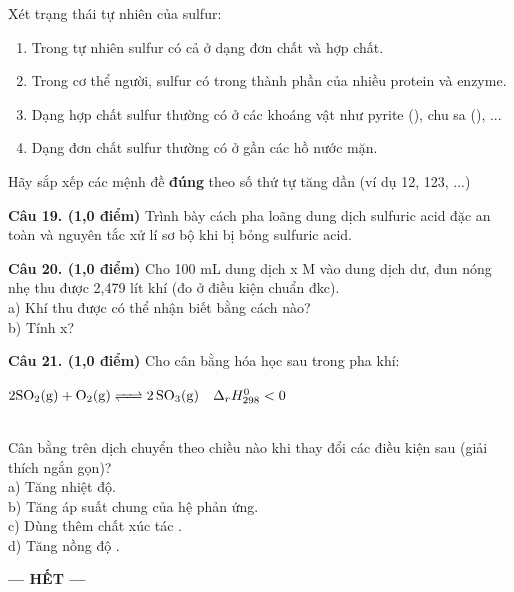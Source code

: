 \documentclass[11pt,a4paper]{article}
\begin{document}
\begin{ex}
Xét trạng thái tự nhiên của sulfur:
\begin{enumerate}[label=\arabic*),noitemsep,topsep=2pt]
\item Trong tự nhiên sulfur có cả ở dạng đơn chất và hợp chất.
\item Trong cơ thể người, sulfur có trong thành phần của nhiều protein và enzyme.
\item Dạng hợp chất sulfur thường có ở các khoáng vật như pyrite (), chu sa (), ...
\item Dạng đơn chất sulfur thường có ở gần các hồ nước mặn.
\end{enumerate}
Hãy sắp xếp các mệnh đề \textbf{đúng} theo số thứ tự tăng dần (ví dụ 12, 123, ...)
\end{ex}

\vspace{6pt}
\vspace{4pt}

\noindent\textbf{Câu 19. (1,0 điểm)} Trình bày cách pha loãng dung dịch sulfuric acid đặc an toàn và nguyên tắc xử lí sơ bộ khi bị bỏng sulfuric acid.

\vspace{10pt}

\vspace{6pt}
\noindent\textbf{Câu 20. (1,0 điểm)} Cho 100 mL dung dịch  x M vào dung dịch  dư, đun nóng nhẹ thu được 2,479 lít khí (đo ở điều kiện chuẩn đkc).\\
a) Khí thu được có thể nhận biết bằng cách nào?\\
b) Tính x?

\vspace{10pt}

\vspace{6pt}
\noindent\textbf{Câu 21. (1,0 điểm)} Cho cân bằng hóa học sau trong pha khí:\\
\centerline{$2\ce{SO2(g) + O2(g) <=> 2SO3(g)} \quad \Delta_r H^0_{298} < 0$}\\
Cân bằng trên dịch chuyển theo chiều nào khi thay đổi các điều kiện sau (giải thích ngắn gọn)?\\
a) Tăng nhiệt độ.\\
b) Tăng áp suất chung của hệ phản ứng.\\
c) Dùng thêm chất xúc tác .\\
d) Tăng nồng độ .

\vspace{10pt}

\begin{center}
\textbf{--- HẾT ---}
\end{center}
\end{document}
